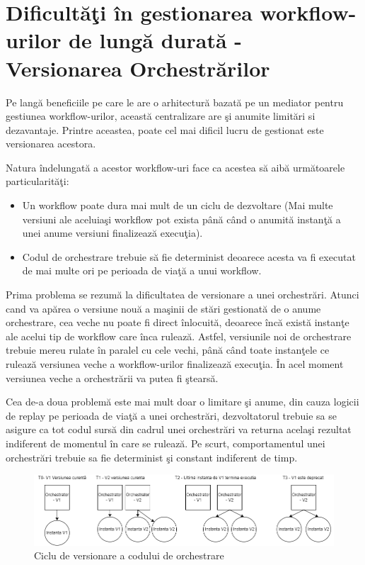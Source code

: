 \section {Dificultăţi în gestionarea workflow-urilor de lungă durată - Versionarea Orchestrărilor }
\quad Pe langă beneficiile pe care le are o arhitectură bazată pe un mediator pentru gestiunea workflow-urilor, această centralizare are şi anumite limitări si dezavantaje. Printre aceastea, poate cel mai dificil lucru de gestionat este versionarea acestora.
\par Natura îndelungată a acestor workflow-uri face ca acestea să aibă următoarele particularităţi: 
\begin{itemize}
\item Un workflow poate dura mai mult de un ciclu de dezvoltare (Mai multe versiuni ale aceluiaşi workflow pot exista până când o anumită instanţă a unei anume versiuni finalizează execuţia). 
\item Codul de orchestrare trebuie să fie determinist deoarece acesta va fi executat de mai multe ori pe perioada de viaţă a unui workflow. 
\end{itemize}
\par Prima problema se rezumă la dificultatea de versionare a unei orchestrări. Atunci cand va apărea o versiune nouă a maşinii de stări gestionată de o anume orchestrare, cea veche nu poate fi direct înlocuită, deoarece încă există instanţe ale acelui tip de workflow care înca rulează. Astfel, versiunile noi de orchestrare trebuie mereu rulate în paralel cu cele vechi, până când toate instanţele ce rulează versiunea veche a workflow-urilor finalizează execuţia. În acel moment versiunea veche a orchestrării va putea fi ştearsă. 
\par Cea de-a doua problemă este mai mult doar o limitare şi anume, din cauza logicii de replay pe perioada de viaţă a unei orchestrări, dezvoltatorul trebuie sa se asigure ca tot codul sursă din cadrul unei orchestrări va returna acelaşi rezultat indiferent de momentul în care se rulează. Pe scurt, comportamentul unei orchestrări trebuie sa fie determinist şi constant indiferent de timp. 
 \begin{figure}[h]
\begin{center}
        \includegraphics[width=1\textwidth]{images/dtf_versioning}
			 \caption{Ciclu de versionare a codului de orchestrare}
			 \label{fig:dtf-versioning}
\end{center}
\end{figure}
